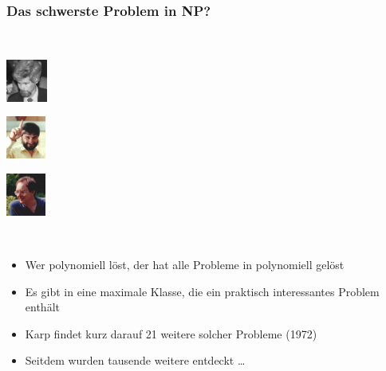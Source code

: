 \documentclass[onlymath]{beamer}
\begin{document}
\begin{frame}\frametitle{Das schwerste Problem in NP?}

\bigskip
~\hfill%
\begin{minipage}{1.5cm}\includegraphics[height=1.4cm]{images/cook}\\\end{minipage}\hfill
\begin{minipage}{1.5cm}\includegraphics[height=1.4cm]{images/levin}\\\end{minipage}\hfill
\begin{minipage}{1.5cm}\includegraphics[height=1.4cm]{images/karp}\\\end{minipage}\hfill~
\bigskip

\pause

\begin{itemize}
\item Wer  polynomiell löst, der hat alle Probleme in  polynomiell gelöst\pause
\item Es gibt in  eine maximale Klasse, die ein praktisch interessantes Problem enthält\pause
\item Karp findet kurz darauf 21 weitere solcher Probleme (1972)
\item Seitdem wurden tausende weitere entdeckt \ldots
\end{itemize}
\bigskip


\end{frame}
\end{document}
